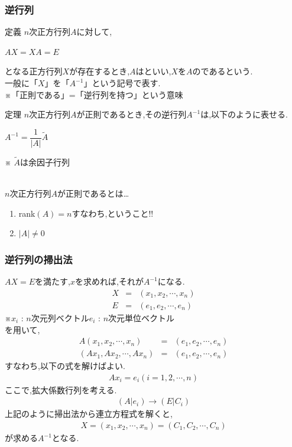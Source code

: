\documentclass[a4paper]{jsarticle}
\begin{document}
\subsubsection{逆行列}
\begin{itembox}[l]{定義}
    $n$次正方行列$A$に対して,
    \begin{center}
        $AX=XA=E$
    \end{center}
    となる正方行列$X$が存在するとき,$A$はといい,$X$を$A$のであるという.\\
    一般に「$X$」を「$A^{-1}$」という記号で表す.\\
    ※「正則である」=「逆行列を持つ」という意味
\end{itembox}
\begin{itembox}[l]{定理}
    $n$次正方行列$A$が正則であるとき,その逆行列$A^{-1}$は,以下のように表せる.
    \begin{center}
        $A^{-1}=\dfrac{1}{|A|}\tilde{A}$
    \end{center}
    ※ $\tilde{A}$は余因子行列
\end{itembox}
\\
$n$次正方行列$A$が正則であるとは\dots
\begin{enumerate}[(1)]
    \item rank$\left(A\right)=n$\quad すなわち,ということ!!
    \item $\left|A\right|\neq0$
\end{enumerate}
\subsubsection{逆行列の掃出法}
$AX=E$\quad を満たす,$x$を求めれば,それが$A^{-1}$になる.
\begin{eqnarray*}
    X&=&\left(x_1,x_2,\cdots,x_n\right)\\
    E&=&\left(e_1,e_2,\cdots,e_n\right)
\end{eqnarray*}
※$x_i$ : $n$次元列ベクトル\quad $e_i$ : $n$次元単位ベクトル\\
を用いて,
\begin{eqnarray*}
    A\left(x_1,x_2,\cdots,x_n\right)&=&\left(e_1,e_2,\cdots,e_n\right)\\
    \left(Ax_1,Ax_2,\cdots,Ax_n\right)&=&\left(e_1,e_2,\cdots,e_n\right)
\end{eqnarray*}
すなわち,以下の式を解けばよい.
\begin{eqnarray*}
    Ax_i=e_i \left(i=1,2,\cdots,n\right)
\end{eqnarray*}
ここで,拡大係数行列を考える.
\begin{eqnarray*}
    \left(A|e_i\right) \rightarrow \left(E|C_i\right)
\end{eqnarray*}
上記のように掃出法から連立方程式を解くと,
\begin{eqnarray*}
    X=\left(x_1,x_2,\cdots,x_n\right)=\left(C_1,C_2,\cdots,C_n\right)
\end{eqnarray*}
が求める$A^{-1}$となる.
\end{document}
